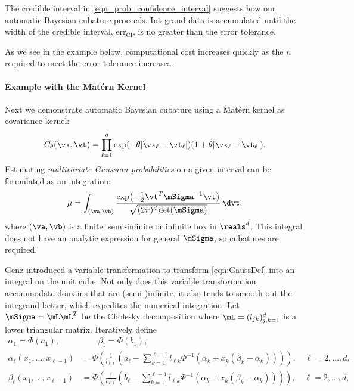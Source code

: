 The credible interval in \eqref{eqn_prob_confidence_interval} suggests how our automatic Bayesian cubature proceeds.  Integrand data is accumulated until the width of the credible interval, $\text{err}_{\text{CI}}$, is no greater than the error tolerance.  


As we see in the example below, computational cost increases quickly as the $n$ required to meet the error tolerance increases.  







\paragraph{Example with the Mat\'ern Kernel} \label{MVN_example}

Next we demonstrate automatic Bayesian cubature using a Mat\'ern kernel as covariance kernel:
\begin{align}
\label{eqn:matern_kernel}
C_{\theta}(\vx, \vt) = \prod_{\ell=1}^d \exp(-\theta|\vx_\ell-\vt_\ell|)(1+\theta |\vx_\ell-\vt_\ell|).
\end{align}
Estimating \emph{multivariate Gaussian probabilities} on a given interval can be formulated as an integration:
\begin{equation}
\label{eqn:GaussDef}
\mu = \int_{(\va,\vb)} \frac{\exp\bigl(- \frac 12 \vt^T \mSigma^{-1} \vt \bigr)}{\sqrt{(2 \pi)^d \det(\mSigma)}} \, \dvt,
\end{equation}
where $(\va,\vb)$ is a finite, semi-infinite or infinite box in $\reals^d$.  This integral does not have an analytic expression for general $\mSigma$, so cubatures are required.  

Genz \cite{Gen93} introduced a variable transformation to transform \eqref{eqn:GaussDef} into an integral on the unit cube.  Not only does this variable transformation accommodate domains that are (semi-)infinite, it also tends to smooth out the integrand better, which expedites the numerical integration.  
\iffalse
Let $\mSigma= \mL \mL^T$ be the Cholesky decomposition where $\mL = (l_{jk})_{j,k=1}^d$ is a lower triangular matrix.  Iteratively define
\begin{align*}
\alpha_1 = \Phi(a_1), 
&\qquad
\beta_1 = \Phi(b_1),
\\
\alpha_\ell(x_1,...,x_{\ell-1}) &= 
\Phi
\left(
\frac{1}{l_{\ell \ell}} 
\left(
a_\ell - \sum_{k=1}^{\ell-1} l_{\ell k} \Phi^{-1}(\alpha_k + x_k(\beta_k-\alpha_k))
\right)
\right), \quad \ell=2,...,d,
\\
\beta_\ell(x_1,...,x_{\ell-1}) &= 
\Phi
\left(
\frac{1}{l_{\ell\ell}} 
\left(
b_\ell - \sum_{k=1}^{\ell-1} l_{\ell k} \Phi^{-1}(\alpha_k + x_k(\beta_k-\alpha_k))
\right)
\right), \quad \ell=2,...,d,
\end{align*}


